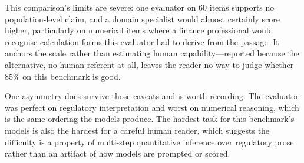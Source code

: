 This comparison's limits are severe: one evaluator on 60 items supports no population-level claim,
and a domain specialist would almost certainly score higher, particularly on numerical items where a
finance professional would recognise calculation forms this evaluator had to derive from the
passage. It anchors the scale rather than estimating human capability---reported because the
alternative, no human referent at all, leaves the reader no way to judge whether 85\% on this
benchmark is good.

One asymmetry does survive those caveats and is worth recording. The evaluator was perfect on
regulatory interpretation and worst on numerical reasoning, which is the same ordering the models
produce. The hardest task for this benchmark's models is also the hardest for a careful human
reader, which suggests the difficulty is a property of multi-step quantitative inference over
regulatory prose rather than an artifact of how models are prompted or scored.
